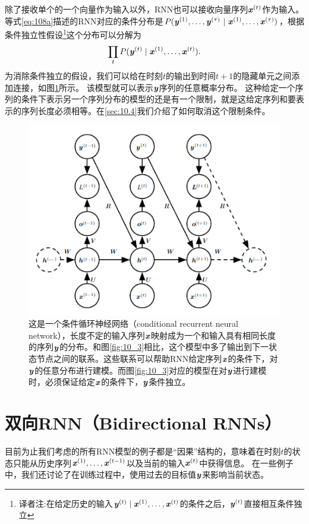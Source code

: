 除了接收单个的一个向量作为输入以外，RNN也可以接收向量序列$\boldsymbol{\mathit{x}}^{(t)}$作为输入。等式\ref{eq:108a}描述的RNN对应的条件分布是$P(\boldsymbol{\mathit{y}}^{(1)}, \dots, \boldsymbol{\mathit{y}}^{(\tau)} ~|~ \boldsymbol{\mathit{x}}^{(1)}, \dots, \boldsymbol{\mathit{x}}^{(\tau)})$，根据条件独立性假设\footnote{译者注:在给定历史的输入$\boldsymbol{\mathit{y}}^{(t)} \mid \boldsymbol{\mathit{x}}^{(1)}, \dots, \boldsymbol{\mathit{x}}^{(t)}$的条件之后，$\boldsymbol{\mathit{y}}^{(t)}$直接相互条件独立}这个分布可以分解为
\begin{align}
 \prod_t P(\boldsymbol{\mathit{y}}^{(t)} \mid \boldsymbol{\mathit{x}}^{(1)}, \dots, \boldsymbol{\mathit{x}}^{(t)}).
\end{align}
为消除条件独立的假设，我们可以给在时刻$t$的输出到时间$t+1$的隐藏单元之间添加连接，如图\ref{fig:10_10}所示。
该模型就可以表示$\boldsymbol{\mathit{y}}$序列的任意概率分布。
这种给定一个序列的条件下表示另一个序列分布的模型的还是有一个限制，就是这给定序列和要表示的序列长度必须相等。在\ref{sec:10.4}我们介绍了如何取消这个限制条件。
\begin{figure}[htbp] %
   \centering
   \includegraphics[width=6in]{fig/chap10/10_10.PNG} 
   \caption{ 这是一个条件循环神经网络（conditional recurrent neural network），长度不定的输入序列$\boldsymbol{\mathit{x}}$映射成为一个和输入具有相同长度的序列$\boldsymbol{\mathit{y}}$的分布。和图\ref{fig:10_3}相比，这个模型中多了输出到下一状态节点之间的联系。这些联系可以帮助RNN给定序列$\boldsymbol{\mathit{x}}$的条件下，对$\boldsymbol{\mathit{y}}$的任意分布进行建模。而图\ref{fig:10_3}对应的模型在对$\boldsymbol{\mathit{y}}$进行建模时，必须保证给定$\boldsymbol{\mathit{x}}$的条件下，$\boldsymbol{\mathit{y}}$条件独立。}
   \label{fig:10_10}
\end{figure}
\section{双向RNN（Bidirectional RNNs）}
\label{sec:10.3}
目前为止我们考虑的所有RNN模型的例子都是“因果”结构的，意味着在时刻$t$的状态只能从历史序列$\boldsymbol{\mathit{x}}^{(1)},\dots,\boldsymbol{\mathit{x}}^{(t-1)}$以及当前的输入$\boldsymbol{\mathit{x}}^{(t)}$中获得信息。
在一些例子中，我们还讨论了在训练过程中，使用过去的目标值$\boldsymbol{\mathit{y}}$来影响当前状态。

